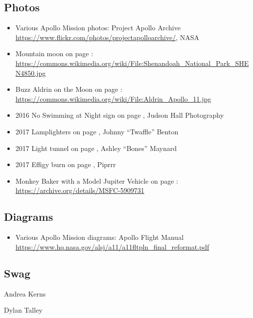 \subsection*{Photos}
\begin{itemize}[noitemsep]
\item Various Apollo Mission photos: Project Apollo Archive \url{https://www.flickr.com/photos/projectapolloarchive/}, NASA
  \item Mountain moon on page \pageref{image:mountainmoom}: \url{https://commons.wikimedia.org/wiki/File:Shenandoah_National_Park_SHEN4850.jpg}
  \item Buzz Aldrin on the Moon on page \pageref{image:buzzaldrin}: \url{https://commons.wikimedia.org/wiki/File:Aldrin_Apollo_11.jpg}
\item 2016 No Swimming at Night sign on page \pageref{fig:2016riversafety}, Judson Hall Photography
\item 2017 Lamplighters on page \pageref{fig:lamplighters2017}, Johnny ``Twaffle'' Benton
\item 2017 Light tunnel on page \pageref{image:tunnel}, Ashley ``Bones'' Maynard
\item 2017 Effigy burn on page \pageref{image:2017effigyburn}, Piprrr
\item Monkey Baker with a Model Jupiter Vehicle on page \pageref{image:missbaker}: \url{https://archive.org/details/MSFC-5909731}
\end{itemize}


\subsection*{Diagrams}
\begin{itemize}[noitemsep]
\item Various Apollo Mission diagrams: Apollo Flight Manual \url{https://www.hq.nasa.gov/alsj/a11/a11fltpln_final_reformat.pdf}
\end{itemize}

\subsection*{Swag}

\begin{description}[leftmargin=6em,noitemsep,style=nextline]
	\item[Design:] Andrea Kerns
  \item[Creation:] Dylan Talley
\end{description}

